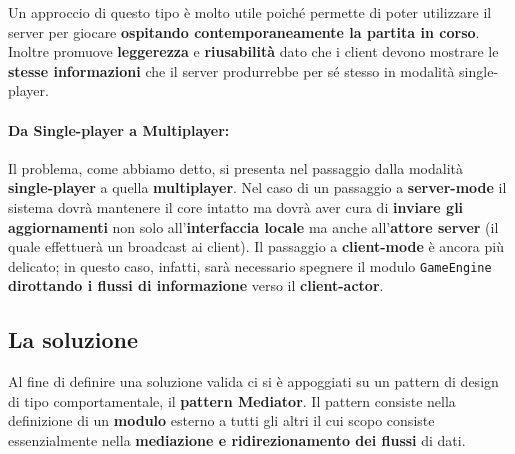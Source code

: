 Un approccio di questo tipo è molto utile poiché permette di poter utilizzare il server per giocare \textbf{ospitando contemporaneamente la partita in corso}. Inoltre promuove \textbf{leggerezza} e \textbf{riusabilità} dato che i client devono mostrare le \textbf{stesse informazioni} che il server produrrebbe per sé stesso in modalità single-player.

\paragraph{Da Single-player a Multiplayer:}
Il problema, come abbiamo detto, si presenta nel passaggio dalla modalità \textbf{single-player} a quella \textbf{multiplayer}. Nel caso di un passaggio a \textbf{server-mode} il sistema dovrà mantenere il core intatto ma dovrà aver cura di \textbf{inviare gli aggiornamenti} non solo all'\textbf{interfaccia locale} ma anche all'\textbf{attore server} (il quale effettuerà un broadcast ai client). Il passaggio a \textbf{client-mode} è ancora più delicato; in questo caso, infatti, sarà necessario spegnere il modulo \texttt{GameEngine} \textbf{dirottando i flussi di informazione} verso il \textbf{client-actor}.

\subsection{La soluzione}
\label{subsec:mediator_solution}
Al fine di definire una soluzione valida ci si è appoggiati su un pattern di design di tipo comportamentale, il \textbf{pattern Mediator}. Il pattern consiste nella definizione di un \textbf{modulo} esterno a tutti gli altri il cui scopo consiste essenzialmente nella \textbf{mediazione e ridirezionamento dei flussi} di dati.

